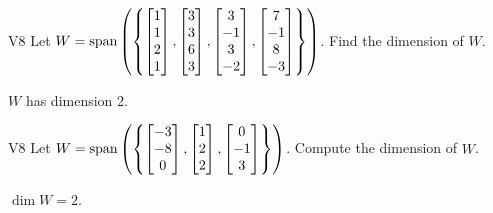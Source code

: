 \begin{problem}{V8}
Let \(W = \operatorname{span} \left( \left\{ \begin{bmatrix} 1 \\ 1 \\ 2 \\ 1 \end{bmatrix}, \begin{bmatrix} 3 \\ 3 \\ 6 \\ 3 \end{bmatrix}, \begin{bmatrix} 3 \\ -1 \\ 3 \\ -2 \end{bmatrix}, \begin{bmatrix} 7 \\ -1 \\ 8 \\ -3 \end{bmatrix} \right\} \right)\).  Find the dimension of \(W\).
\end{problem}
\begin{solution}
\(W\) has dimension 2.
\end{solution}


\begin{problem}{V8}
Let \(W = \operatorname{span} \left( \left\{  \begin{bmatrix} -3 \\ -8 \\ 0 \end{bmatrix}, \begin{bmatrix} 1 \\ 2 \\ 2 \end{bmatrix}, \begin{bmatrix} 0 \\ -1 \\ 3 \end{bmatrix} \right\} \right)\).  Compute the dimension of \(W\).
\end{problem}
\begin{solution}
\(\dim W = 2\).
\end{solution}


